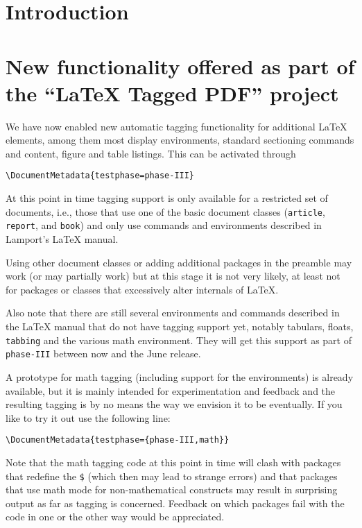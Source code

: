 \documentclass{ltnews}
\providecommand\tubcommand[1]{}
\begin{document}
\tubcommand{\addtolength\textheight{4.2pc}}   %

\maketitle
{  \spaceskip=3.33pt 
\tableofcontents}

\setlength{}


\medskip


\section{Introduction}


\section{New functionality offered as part of the
  \enquote{\LaTeX{} Tagged PDF} project}

We have now enabled new automatic tagging functionality for additional
\LaTeX{} elements, among them most display environments, standard
sectioning commands and content, figure and table listings. This can
be activated through
\begin{verbatim}
\DocumentMetadata{testphase=phase-III}
\end{verbatim}
At this point in time tagging support is only available for a
restricted set of documents, i.e., those that use one of the basic
document classes (\texttt{article}, \texttt{report}, and
\texttt{book}) and only use commands and environments described in
Lamport's \LaTeX{} manual.

Using other document classes or adding additional packages in the
preamble may work (or may partially work) but at this stage it is not
very likely, at least not for packages or classes that excessively
alter internals of \LaTeX{}.

Also note that there are still several environments and commands
described in the \LaTeX{} manual that do not have tagging support yet,
notably tabulars, floats, \texttt{tabbing} and the various math
environment.  They will get this support as part of \texttt{phase-III}
between now and the June release.

A prototype for math tagging (including support for the 
environments) is already available, but it is mainly intended for
experimentation and feedback and the resulting tagging is by no means
the way we envision it to be eventually. If you like to try it out use
the following line:
\begin{verbatim}
\DocumentMetadata{testphase={phase-III,math}}
\end{verbatim}
Note that the math tagging code at this point in time will clash with
packages that redefine the \texttt{\$} (which then may lead to strange
errors) and that packages that use math mode for non-mathematical
constructs may result in surprising output as far as tagging is
concerned. Feedback on which packages fail with the code in one or the
other way would be appreciated.
\end{document}
